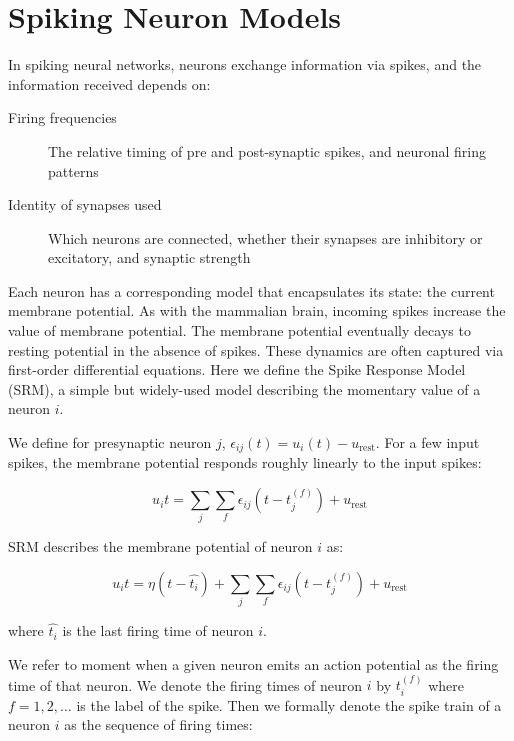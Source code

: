 \documentclass[fyp]{socreport}
\begin{document}
\section{Spiking Neuron Models\label{sec:spiking-neuron-model}}


In spiking neural networks, neurons exchange information via spikes, and the
information received depends on:

\begin{description}
\item[{Firing frequencies}] The relative timing of pre and post-synaptic spikes,
and neuronal firing patterns
\item[{Identity of synapses used}] Which neurons are connected, whether their
synapses are inhibitory or excitatory, and synaptic strength
\end{description}

Each neuron has a corresponding model that encapsulates its state: the current
membrane potential. As with the mammalian brain, incoming spikes increase the
value of membrane potential. The membrane potential eventually decays to resting
potential in the absence of spikes. These dynamics are often captured via
first-order differential equations. Here we define the Spike Response Model
(SRM), a simple but widely-used model describing the momentary value of a neuron
\(i\).

We define for presynaptic neuron \(j\),
\(\epsilon_{ij}(t) = u_{i}(t) - u_{\text{rest}}\). For a few input spikes, the
membrane potential responds roughly linearly to the input spikes:

\begin{equation} u_i{t} = \sum_{j}\sum_{f} \epsilon_{ij}(t - t_j^{(f)}) + u_{\text{rest}}
\end{equation}

SRM describes the membrane potential of neuron \(i\) as:

\begin{equation} u_i{t} = \eta (t - \hat{t_i}) + \sum_{j}\sum_{f} \epsilon_{ij}(t - t_j^{(f)}) + u_{\text{rest}}
\end{equation}

where \(\hat{t_i}\) is the last firing time of neuron \(i\).

We refer to moment when a given neuron emits an action potential as the firing
time of that neuron. We denote the firing times of neuron \(i\) by \(t_i^{(f)}\)
where \(f = 1,2,\dots\) is the label of the spike.  Then we formally denote the
spike train of a neuron \(i\) as the sequence of firing times:
\end{document}
